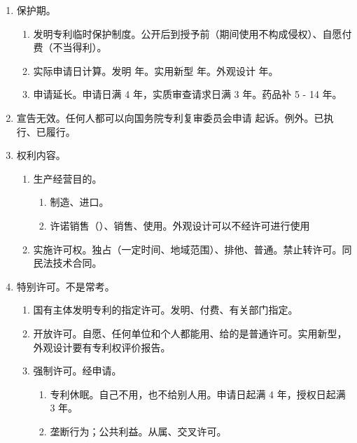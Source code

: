 \begin{enumerate}
\begin{enumerate}
          \item 国际。发明、实用新型 1 年。外观设计、商标 6 个月。
          \item 国内。占坑行为。
        \end{enumerate}
  \item 保护期。
        \begin{enumerate}
          \item 发明专利临时保护制度。公开后到授予前（期间使用不构成侵权）、自愿付费（不当得利）。
          \item 实际申请日计算。发明  年。实用新型  年。外观设计  年。
          \item 申请延长。申请日满 4 年，实质审查请求日满 3 年。药品补 5 - 14 年。
        \end{enumerate}
  \item 宣告无效。任何人都可以向国务院专利复审委员会申请 \yjt 起诉。例外。已执行、已履行。
  \item 权利内容。
        \begin{enumerate}
          \item 生产经营目的。
                \begin{enumerate}
                  \item 制造、进口。
                  \item 许诺销售（）、销售、使用。外观设计可以不经许可进行使用
                \end{enumerate}
          \item 实施许可权。独占（一定时间、地域范围）、排他、普通。禁止转许可。同民法技术合同。
        \end{enumerate}
  \item 特别许可。不是常考。
        \begin{enumerate}
          \item 国有主体发明专利的指定许可。发明、付费、有关部门指定。
          \item 开放许可。自愿、任何单位和个人都能用、给的是普通许可。实用新型，外观设计要有专利权评价报告。
          \item 强制许可。经申请。
                \begin{enumerate}
                  \item 专利休眠。自己不用，也不给别人用。申请日起满 4 年，授权日起满 3 年。
                  \item 垄断行为；公共利益。从属、交叉许可。
                \end{enumerate}
        \end{enumerate}

\end{enumerate}

